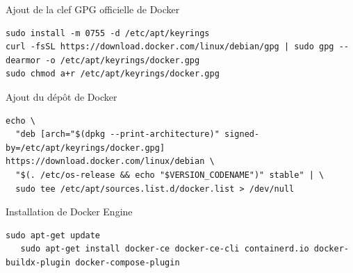 
\begin{frame}[fragile]{Ajout de la clef GPG officielle de Docker}

\begin{tiny}
\begin{Verbatim}[commandchars=\&\#\#]
sudo install -m 0755 -d /etc/apt/keyrings
curl -fsSL https://download.docker.com/linux/debian/gpg | sudo gpg --dearmor -o /etc/apt/keyrings/docker.gpg
sudo chmod a+r /etc/apt/keyrings/docker.gpg
\end{Verbatim}
\end{tiny}

\end{frame}


\begin{frame}[shrink=7,fragile]{Ajout du dépôt de Docker}

\begin{tiny}
\begin{Verbatim}[commandchars=\&\#\#]
  echo \
  "deb [arch="$(dpkg --print-architecture)" signed-by=/etc/apt/keyrings/docker.gpg] https://download.docker.com/linux/debian \
  "$(. /etc/os-release && echo "$VERSION_CODENAME")" stable" | \
  sudo tee /etc/apt/sources.list.d/docker.list > /dev/null
\end{Verbatim}
\end{tiny}

\end{frame}


\begin{frame}[fragile]{Installation de Docker Engine}

\begin{tiny}
\begin{Verbatim}[commandchars=\&\#\#]
   sudo apt-get update
   sudo apt-get install docker-ce docker-ce-cli containerd.io docker-buildx-plugin docker-compose-plugin
\end{Verbatim}
\end{tiny}

\end{frame}


